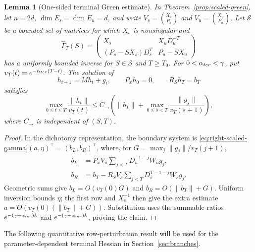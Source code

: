 \documentclass[twocolumn,nameyear,amsthm]{autart}
\numberwithin{equation}{section}
\newtheorem{lemma}[theorem]{Lemma}
\begin{document}
\begin{lemma}[One-sided terminal Green estimate]\label{lem:right-green}
In Theorem~\ref{prop:scaled-green}, let $n=2d$, $\dim E_s=\dim E_u=d$, and
write $V_s=\binom{X_s}{P_s}$ and $V_u=\binom{X_u}{P_u}$.  Let $\mathcal S$
be a bounded set of matrices for which $X_s$ is nonsingular and
\begin{equation}\label{eq:right-scaled-gamma}
 \widehat\Gamma_T(S)=
 \begin{pmatrix}
 X_s&X_uD_u^{-T}\\
 (P_s-SX_s)D_s^T&P_u-SX_u
 \end{pmatrix}
\end{equation}
has a uniformly bounded inverse for $S\in\mathcal S$ and $T\ge T_0$.
For $0<\alpha_{\rm ter}<\gamma$, put
$v_T(t)=e^{-\alpha_{\rm ter}(T-t)}$.  The solution of
\begin{equation}\label{eq:right-green-problem}
 h_{t+1}=Mh_t+g_t,\qquad P_xh_0=0,\qquad R_Sh_T=b_T
\end{equation}
satisfies
\begin{equation}\label{eq:right-green-bound}
 \max_{0\le t\le T}\frac{\|h_t\|}{v_T(t)}
 \le C_{\to}\left(\|b_T\|+
 \max_{0\le s<T}\frac{\|g_s\|}{v_T(s+1)}\right),
\end{equation}
where $C_{\to}$ is independent of $(S,T)$.
\end{lemma}

\begin{proof}
In the dichotomy representation, the boundary system is
\eqref{eq:right-scaled-gamma}$(a,\eta)^\top=(b_L,b_R)^\top$, where, for
$G=\max_j\|g_j\|/v_T(j+1)$,
\[
 \begin{aligned}
 b_L&=P_xV_u\sum_{j<T}D_u^{-1-j}W_ug_j,\\
 b_R&=b_T-R_SV_s\sum_{j<T}D_s^{T-1-j}W_sg_j.
 \end{aligned}
\]
Geometric sums give
$b_L=O(v_T(0)G)$ and $b_R=O(\|b_T\|+G)$.  Uniform inversion bounds $\eta$;
the first row and $X_s^{-1}$ then give the extra estimate
$a=O(v_T(0)(\|b_T\|+G))$.  Substitution uses the summable ratios
$e^{-(\gamma+\alpha_{\rm ter})k}$ and
$e^{-(\gamma-\alpha_{\rm ter})k}$, proving the claim.
\end{proof}

The following quantitative row-perturbation result will be used for the
parameter-dependent terminal Hessian in Section~\ref{sec:branches}.
\end{document}
